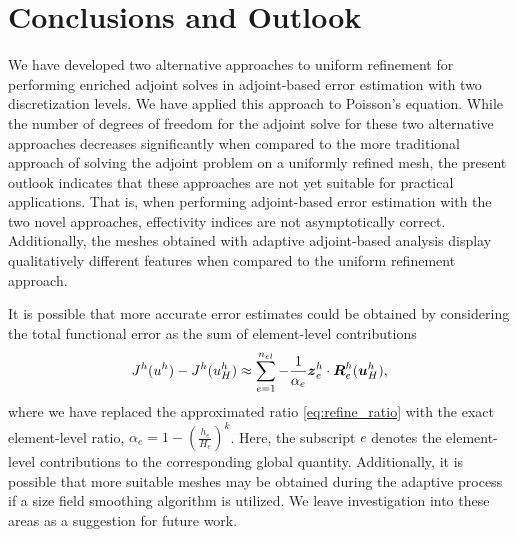 \section{Conclusions and Outlook}

We have developed two alternative approaches to uniform refinement
for performing enriched adjoint solves in adjoint-based error estimation
with two discretization levels. We have applied this approach to
Poisson's equation. While the number of
degrees of freedom for the adjoint solve for these two
alternative approaches decreases significantly when compared to the
more traditional approach of solving the adjoint problem on
a uniformly refined mesh, the present outlook indicates that
these approaches are not yet suitable for practical applications.
That is, when performing adjoint-based error estimation with the
two novel approaches, effectivity indices are not asymptotically
correct. Additionally, the meshes obtained with adaptive adjoint-based
analysis display qualitatively different features when
compared to the uniform refinement approach.

It is possible that more accurate error estimates could be
obtained by considering the total functional error as the sum
of element-level contributions
\begin{gather}
J^h(u^h) - J^h(u^h_H) \approx \sum_{e=1}^{n_{el}}
- \frac{1}{\alpha_e} \boldsymbol{z}^h_e \cdot \boldsymbol{R}^h_e(\boldsymbol{u}^h_H),
\end{gather}
where we have replaced the approximated ratio
\eqref{eq:refine_ratio} with the exact element-level
ratio, $\alpha_e = 1 - \left( \frac{h_e}{H_e} \right)^k$. Here, the
subscript $e$ denotes the element-level contributions
to the corresponding global quantity. Additionally, it is
possible that more suitable meshes may be obtained during
the adaptive process if a size field smoothing
algorithm is utilized. We leave investigation into these
areas as a suggestion for future work.
